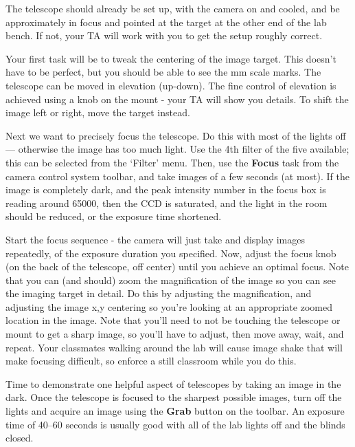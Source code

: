 \begin{steps}
	\item The telescope should already be set up, with the camera on and cooled, and be approximately
	in focus and pointed at the target at the other end of the lab bench. If not, your TA will
	work with you to get the setup roughly correct.
	
	\item Your first task will be to tweak the centering of the image target. This doesn’t have to be
	perfect, but you should be able to see the mm scale marks. The telescope can be moved in elevation (up-down). The fine control of elevation is achieved using a knob on the mount - your TA will show you details. To shift the image left or right, move the target instead.
	
	\item Next we want to precisely focus the telescope. Do this with most of the lights off --- otherwise
	the image has too much light. Use the 4th filter of the five available; this can be selected
	from the ‘Filter’ menu. Then, use the \textbf{Focus} task from the camera control system toolbar,
	and take images of a few seconds (at most). If the image is completely dark, and the peak intensity number in the focus box is reading around 65000, then the CCD is saturated, and the light in the room should be reduced, or the exposure time shortened.
	
	\item Start the focus sequence - the camera will just
	take and display images repeatedly, of the exposure duration you specified. Now, adjust
	the focus knob (on the back of the telescope, off center) until you achieve an optimal focus.
	Note that you can (and should) zoom the magnification of the image so you can see the
	imaging target in detail. Do this by adjusting the magnification, and adjusting the image
	x,y centering so you’re looking at an appropriate zoomed location in the image. Note that
	you’ll need to not be touching the telescope or mount to get a sharp image, so you’ll
	have to adjust, then move away, wait, and repeat. Your classmates walking around the lab
	will cause image shake that will make focusing difficult, so enforce a still classroom while
	you do this.
	
	\item Time to demonstrate one helpful aspect of telescopes by taking an image in the dark. Once the telescope is focused to the sharpest possible images, turn off the lights and acquire an image using the
	\textbf{Grab} button on the toolbar. An exposure time of 40--60 seconds is usually good with all of
	the lab lights off and the blinds closed.
	

\end{steps}
